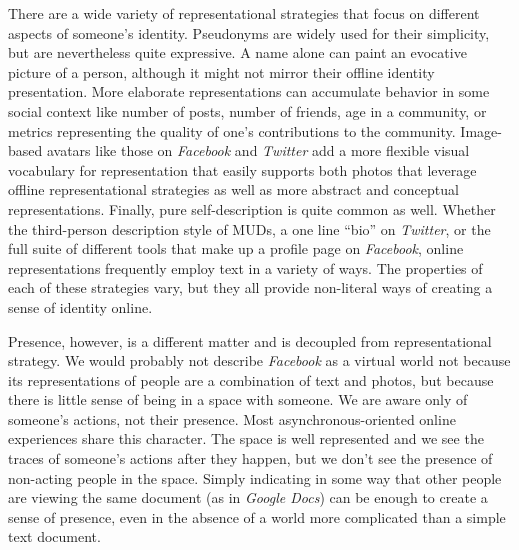 There are a wide variety of representational strategies that focus on different aspects of someone's identity. Pseudonyms are widely used for their simplicity, but are nevertheless quite expressive. A name alone can paint an evocative picture of a person, although it might not mirror their offline identity presentation. \citep{Jacobson:1996tb} More elaborate representations can accumulate behavior in some social context like number of posts, number of friends, age in a community, or metrics representing the quality of one's contributions to the community. Image-based avatars like those on \emph{Facebook} and \emph{Twitter} add a more flexible visual vocabulary for representation that easily supports both photos that leverage offline representational strategies as well as more abstract and conceptual representations. Finally, pure self-description is quite common as well. Whether the third-person description style of MUDs, a one line ``bio'' on \emph{Twitter}, or the full suite of different tools that make up a profile page on \emph{Facebook}, online representations frequently employ text in a variety of ways. The properties of each of these strategies vary, but they all provide non-literal ways of creating a sense of identity online. 

Presence, however, is a different matter and is decoupled from representational strategy. We would probably not describe \emph{Facebook} as a virtual world not because its representations of people are a combination of text and photos, but because there is little sense of being in a space with someone. We are aware only of someone's actions, not their presence. Most asynchronous-oriented online experiences share this character. The space is well represented and we see the traces of someone's actions after they happen, but we don't see the presence of non-acting people in the space. Simply indicating in some way that other people are viewing the same document (as in \emph{Google Docs}) can be enough to create a sense of presence, even in the absence of a world more complicated than a simple text document. 



%
%



